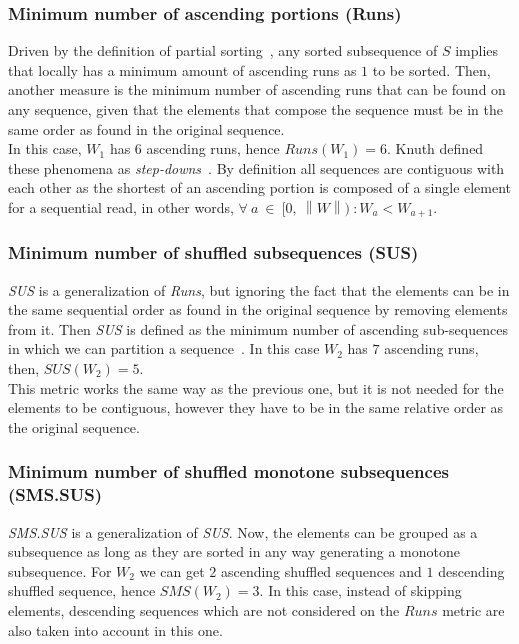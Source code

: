 \subsubsection{Minimum number of ascending portions (Runs)}
Driven by the definition of partial sorting~\cite{10.5555/1614191}, any sorted subsequence of $S$ implies that locally has a minimum amount of ascending runs as $1$ to be sorted. Then, another measure is the minimum number of ascending runs that can be found on any sequence, given that the elements that compose the sequence must be in the same order as found in the original sequence.\\

In this case, $W_1$ has $6$ ascending runs, hence $Runs(W_1) =6$. Knuth defined these phenomena as \textit{step-downs}~\cite{10.5555/270146}. By definition all sequences are contiguous with each other as the shortest of an ascending portion is composed of a single element for a sequential read, in other words, $\forall~a~\in~[0,~\left\|W\right\|)~: W_a < W_{a+1}$.\\

\subsubsection{Minimum number of shuffled subsequences (SUS)}
\emph{SUS} is a generalization of \textit{Runs}, but ignoring the fact that the elements can be in the same sequential order as found in the original sequence by removing elements from it. Then \emph{SUS} is defined as the minimum number of ascending sub-sequences in which we can partition a sequence~\cite{Carlsson_Levcopoulos_Petersson_1993}. In this case $W_2$ has $7$ ascending runs, then, $SU\!S(W_2) = 5$.\\

This metric works the same way as the previous one, but it is not needed for the elements to be contiguous, however they have to be in the same relative order as the original sequence.\\


\subsubsection{Minimum number of shuffled monotone subsequences (SMS.SUS)}
\emph{SMS.SUS} is a generalization of \emph{SUS}. Now, the elements can be grouped as a subsequence as long as they are sorted in any way generating a monotone subsequence. For $W_2$ we can get $2$ ascending shuffled sequences\cite{Carlsson_Levcopoulos_Petersson_1993} and $1$ descending shuffled sequence, hence $S\!M\!S(W_2) = 3$. In this case, instead of skipping elements, descending sequences which are not considered on the $Runs$ metric are also taken into account in this one.\\


